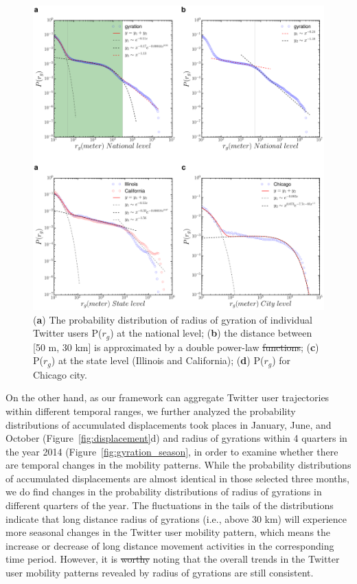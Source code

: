 \documentclass[ijgi,article,accept,moreauthors,pdftex,10pt,a4paper]{mdpi}
\theoremstyle{mdpi}
\newcounter{ex}
\newcounter{re}
\theoremstyle{mdpidefinition}
\providecommand{\DIFadd}[1]{{\protect\color{blue}\uwave{#1}}} %
\providecommand{\DIFdel}[1]{{\protect\color{red}\sout{#1}}}                      %
\providecommand{\DIFaddbegin}{} %
\providecommand{\DIFaddend}{} %
\providecommand{\DIFdelbegin}{} %
\providecommand{\DIFdelend}{} %
\providecommand{\DIFaddFL}[1]{\DIFadd{#1}} %
\providecommand{\DIFdelFL}[1]{\DIFdel{#1}} %
\providecommand{\DIFaddbeginFL}{} %
\providecommand{\DIFaddendFL}{} %
\providecommand{\DIFdelbeginFL}{} %
\providecommand{\DIFdelendFL}{} %
\begin{document}
\begin{figure}[ht]
\centering
\includegraphics[width=1.0\linewidth]{./figures/gyration2}
\caption{ ({\bf a}) The probability distribution of radius of gyration of individual Twitter users P($r_{g}$) at the national level; ({\bf b}) the distance between [50 m, 30 km] is approximated by a double power-law \DIFdelbeginFL \DIFdelFL{functions}\DIFdelendFL \DIFaddbeginFL \DIFaddFL{function}\DIFaddendFL ; ({\bf c}) P($r_{g}$) at the state level (Illinois and California); ({\bf d}) P($r_{g}$) for Chicago city.} 
\label{fig:gyration}
\end{figure}
\FloatBarrier

On the other hand, as our framework can aggregate Twitter user trajectories within different temporal ranges, we further analyzed the probability distributions of accumulated displacements took places in January, June, and October (Figure~\ref{fig:displacement}d) and radius of gyrations within 4 quarters in the year 2014 (Figure~\ref{fig:gyration_season}, in order to examine whether there are temporal changes in the mobility patterns.
While the probability distributions of accumulated displacements are almost identical in those selected three months,  we do find changes in the probability distributions of radius of gyrations in different quarters of the year. 
The fluctuations in the tails of the distributions indicate that long distance radius of gyrations (i.e., above 30 km) will experience more seasonal changes in the Twitter user mobility pattern, which means the increase or decrease of long distance movement activities in the corresponding time period. 
However, it is \DIFdelbegin \DIFdel{worthy }\DIFdelend \DIFaddbegin \DIFadd{worth }\DIFaddend noting that the overall trends in the Twitter user mobility patterns revealed by radius of gyrations are still consistent.
\end{document}
